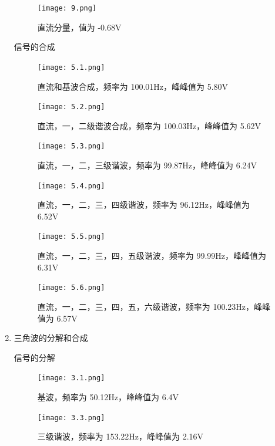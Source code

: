 \documentclass[dvipsnames, svgnames,a4paper,11pt]{article}
\begin{document}
\begin{enumerate}
\begin{figure}[htbp]
      \begin{minipage}[t]{0.48\textwidth}
        \centering
        \texttt{[image: 9.png]}
        \caption{直流分量，值为 -0.68V}
      \end{minipage}
    \end{figure}

    \newpage
    信号的合成
    \begin{figure}[htbp]
      \centering
      \begin{minipage}[t]{0.48\textwidth}
      \centering
      \texttt{[image: 5.1.png]}
      \caption{直流和基波合成，频率为 100.01Hz，峰峰值为 5.80V}
      \end{minipage}
      \begin{minipage}[t]{0.48\textwidth}
      \centering
      \texttt{[image: 5.2.png]}
      \caption{直流，一，二级谐波合成，频率为 100.03Hz，峰峰值为 5.62V}
      \end{minipage}

      \begin{minipage}[t]{0.48\textwidth}
      \centering
      \texttt{[image: 5.3.png]}
      \caption{直流，一，二，三级谐波，频率为 99.87Hz，峰峰值为 6.24V}
      \end{minipage}
      \centering
      \begin{minipage}[t]{0.48\textwidth}
      \centering
      \texttt{[image: 5.4.png]}
      \caption{直流，一，二，三，四级谐波，频率为 96.12Hz，峰峰值为 6.52V}
      \end{minipage}

      \begin{minipage}[t]{0.48\textwidth}
      \centering
      \texttt{[image: 5.5.png]}
      \caption{直流，一，二，三，四，五级谐波，频率为 99.99Hz，峰峰值为 6.31V}
      \end{minipage}
      \begin{minipage}[t]{0.48\textwidth}
      \centering
      \texttt{[image: 5.6.png]}
      \caption{直流，一，二，三，四，五，六级谐波，频率为 100.23Hz，峰峰值为 6.57V}
      \end{minipage}
    \end{figure}



  \newpage
  \item 三角波的分解和合成
    
    信号的分解
    \begin{figure}[htbp]
      \centering
      \begin{minipage}[t]{0.48\textwidth}
      \centering
      \texttt{[image: 3.1.png]}
      \caption{基波，频率为 50.12Hz，峰峰值为 6.4V}
      \end{minipage}
      \begin{minipage}[t]{0.48\textwidth}
      \centering
      \texttt{[image: 3.3.png]}
      \caption{三级谐波，频率为 153.22Hz，峰峰值为 2.16V}
      \end{minipage}


\end{figure}
\end{enumerate}
\end{document}
